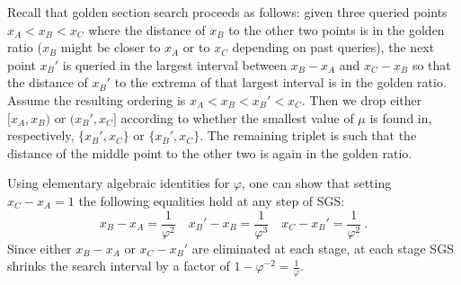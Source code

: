 \documentclass[11pt]{hackednow}
\begin{document}
Recall that golden section search proceeds as follows: given three queried points $x_A < x_B < x_C$ where the distance of $x_B$ to the other two points is in the golden ratio ($x_B$ might be closer to $x_A$ or to $x_C$ depending on past queries), the next point $x_B'$ is queried in the largest interval between $x_B-x_A$ and $x_C-x_B$ so that the distance of $x_B'$ to the extrema of that largest interval is in the golden ratio. Assume the resulting ordering is $x_A < x_B < x_B' < x_C$. Then we drop either $[x_A,x_B)$ or $(x_B',x_C]$ according to whether the smallest value of $\mu$ is found in, respectively, $\{x_B',x_C\}$ or $\{x_B',x_C\}$. The remaining triplet is such that the distance of the middle point to the other two is again in the golden ratio.

Using elementary algebraic identities for $\varphi$, one can show that setting $x_C-x_A = 1$ the following equalities hold at any step of SGS:
\begin{equation}
\label{eq:sgs-ratios}
    x_B-x_A = \frac{1}{\varphi^2} \quad x_B'-x_B = \frac{1}{\varphi^3} \quad x_C - x_B' = \frac{1}{\varphi^2}~.
\end{equation}
Since either $x_B-x_A$ or $x_C - x_B'$ are eliminated at each stage, at each stage SGS shrinks the search interval by a factor of $1 - \varphi^{-2} = \tfrac{1}{\varphi}$.
\end{document}
